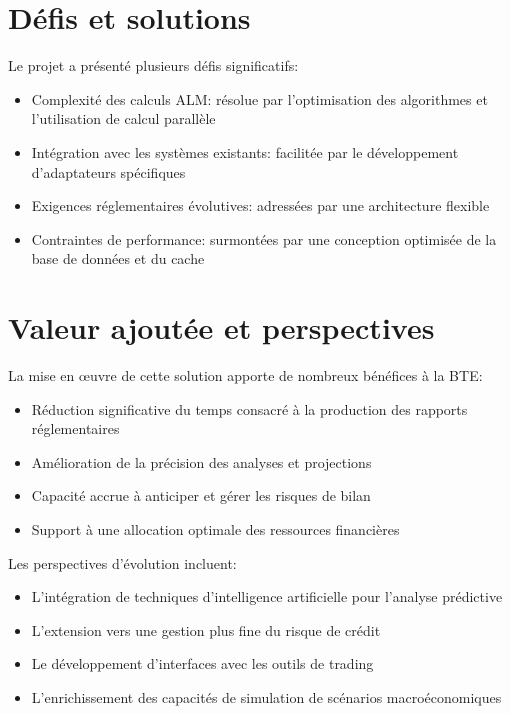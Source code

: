 \documentclass[12pt,a4paper]{report}
\begin{document}
\section*{Défis et solutions}
Le projet a présenté plusieurs défis significatifs:
\begin{itemize}
    \item Complexité des calculs ALM: résolue par l'optimisation des algorithmes et l'utilisation de calcul parallèle
    \item Intégration avec les systèmes existants: facilitée par le développement d'adaptateurs spécifiques
    \item Exigences réglementaires évolutives: adressées par une architecture flexible
    \item Contraintes de performance: surmontées par une conception optimisée de la base de données et du cache
\end{itemize}

\section*{Valeur ajoutée et perspectives}
La mise en œuvre de cette solution apporte de nombreux bénéfices à la BTE:
\begin{itemize}
    \item Réduction significative du temps consacré à la production des rapports réglementaires
    \item Amélioration de la précision des analyses et projections
    \item Capacité accrue à anticiper et gérer les risques de bilan
    \item Support à une allocation optimale des ressources financières
\end{itemize}

Les perspectives d'évolution incluent:
\begin{itemize}
    \item L'intégration de techniques d'intelligence artificielle pour l'analyse prédictive
    \item L'extension vers une gestion plus fine du risque de crédit
    \item Le développement d'interfaces avec les outils de trading
    \item L'enrichissement des capacités de simulation de scénarios macroéconomiques
\end{itemize}
\end{document}
